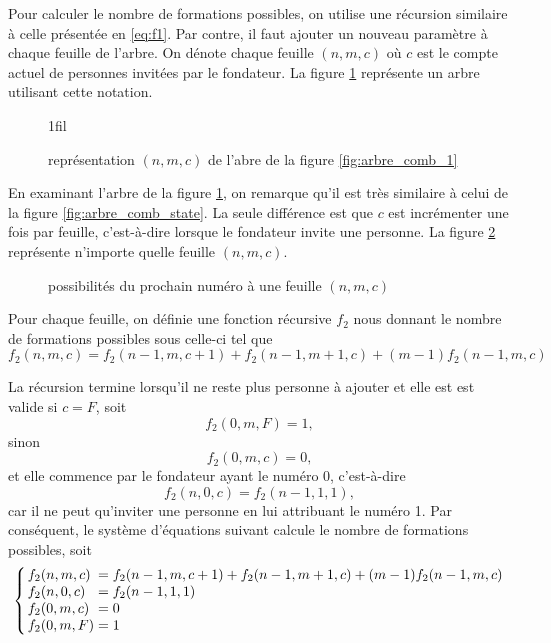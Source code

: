 \documentclass[11pt]{article}
\makeatletter
\newcommand*{\centerfloat}{%
    \parindent \z@%
    \leftskip \z@ \@plus 1fil \@minus \textwidth%
    \rightskip\leftskip%
    \parfillskip \z@skip}%
\makeatother
\begin{document}
Pour calculer le nombre de formations possibles, on utilise une
récursion similaire à celle présentée en \eqref{eq:f1}. Par contre, il
faut ajouter un nouveau paramètre à chaque feuille de l'arbre. On dénote
chaque feuille $(n,m,c)$ où $c$ est le compte actuel de personnes invitées
par le fondateur. La figure \ref{fig:arbre_comb_1_state} représente un
arbre utilisant cette notation.

\begin{figure}[H]
    \centerfloat
    
    \caption{représentation $(n,m,c)$ de l'abre de la figure \ref{fig:arbre_comb_1}}
    \label{fig:arbre_comb_1_state}
\end{figure}

En examinant l'arbre de la figure \ref{fig:arbre_comb_1_state}, on remarque
qu'il est très similaire à celui de la figure \ref{fig:arbre_comb_state}. La
seule différence est que $c$ est incrémenter une fois par feuille, c'est-à-dire
lorsque le fondateur invite une personne. La figure \ref{fig:arbre_feuille_1}
représente n'importe quelle feuille $(n,m,c)$.

\begin{figure}[H]
    \centering
    
    \caption{possibilités du prochain numéro à une feuille $(n,m,c)$}
    \label{fig:arbre_feuille_1}
\end{figure}

Pour chaque feuille, on définie une fonction récursive $f_2$ nous donnant le
nombre de formations possibles sous celle-ci tel que
\begin{equation*}
    f_2(n,m,c)=f_2(n-1,m,c+1)+f_2(n-1,m+1,c)+(m-1)f_2(n-1,m,c)
\end{equation*}

La récursion termine lorsqu'il ne reste plus personne à ajouter et elle est
est valide si $c=F$, soit
\begin{equation*}
    f_2(0,m,F)=1,
\end{equation*}
sinon
\begin{equation*}
    f_2(0,m,c)=0,
\end{equation*}
et elle commence par le fondateur ayant le numéro 0, c'est-à-dire
\begin{equation*}
    f_2(n,0,c)=f_2(n-1,1,1),
\end{equation*}
car il ne peut qu'inviter une personne en lui attribuant le numéro 1. Par
conséquent, le système d'équations suivant calcule le nombre de formations 
possibles, soit
\begin{equation}\label{eq:f2}
    \arraycolsep=1.4pt\def\arraystretch{1}
    \left\{
        \begin{array}{lcl}
            f_2(n,m,c)&=&f_2(n-1,m,c+1)+f_2(n-1,m+1,c)+(m-1)f_2(n-1,m,c)\\
            f_2(n,0,c)&=&f_2(n-1,1,1)\\
            f_2(0,m,c)&=&0\\
            f_2(0,m,F)&=&1\\
        \end{array}
    \right.
\end{equation}
\end{document}
